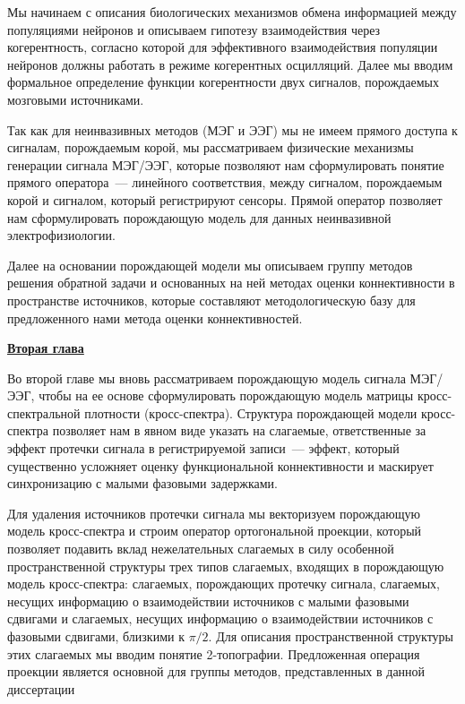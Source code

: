 Мы начинаем с описания биологических механизмов обмена информацией
между популяциями нейронов и описываем гипотезу взаимодействия через когерентность,
согласно которой для эффективного взаимодействия популяции нейронов должны работать
в режиме когерентных осцилляций. Далее мы вводим формальное определение функции когерентности
двух сигналов, порождаемых мозговыми источниками.

Так как для неинвазивных методов (МЭГ и ЭЭГ) мы не имеем прямого доступа к сигналам,
порождаемым корой, мы рассматриваем физические механизмы генерации сигнала МЭГ/ЭЭГ,
которые позволяют нам сформулировать понятие прямого оператора~--- линейного соответствия,
между сигналом, порождаемым корой и сигналом, который регистрируют сенсоры. Прямой
оператор позволяет нам сформулировать порождающую модель для данных неинвазивной электрофизиологии.

Далее на основании порождающей модели мы описываем группу методов решения обратной
задачи и основанных на ней методах оценки коннективности в пространстве источников,
которые составляют методологическую базу для предложенного нами метода оценки
коннективностей.




\underline{\textbf{Вторая глава}}

Во второй главе мы вновь рассматриваем порождающую модель сигнала МЭГ/ЭЭГ,
чтобы на ее основе сформулировать порождающую модель матрицы кросс-спектральной плотности (кросс-спектра).
Структура порождающей модели кросс-спектра позволяет нам в явном виде указать на слагаемые, ответственные
за эффект протечки сигнала в регистрируемой записи~--- эффект, который существенно усложняет
оценку функциональной коннективности и маскирует синхронизацию с малыми фазовыми задержками.


Для удаления источников протечки сигнала мы векторизуем порождающую модель кросс-спектра и
строим оператор ортогональной проекции, который позволяет подавить вклад нежелательных
слагаемых в силу особенной пространственной структуры трех типов слагаемых, входящих
в порождающую модель кросс-спектра: слагаемых, порождающих протечку сигнала,
слагаемых, несущих информацию о взаимодействии источников с малыми фазовыми сдвигами и
слагаемых, несущих информацию о взаимодействии источников с фазовыми сдвигами, близкими к
$\pi/2$. Для описания пространственной структуры этих слагаемых мы вводим понятие 2-топографии.
Предложенная операция проекции является основной для группы методов, представленных в данной диссертации


